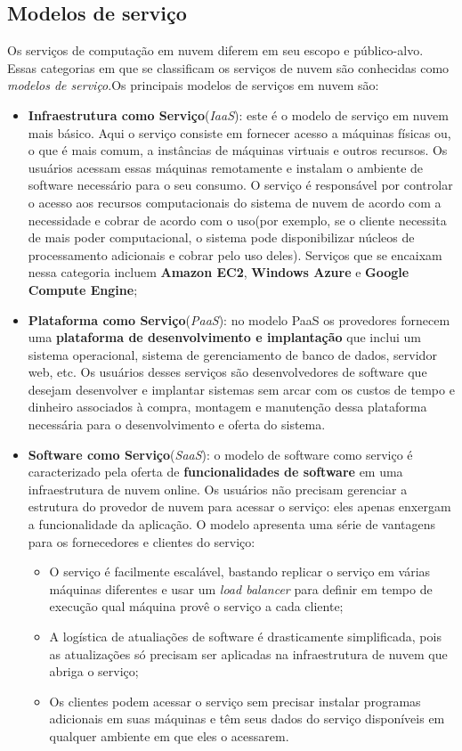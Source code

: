 \subsection{Modelos de serviço}
Os serviços de computação em nuvem diferem em seu escopo e público-alvo. Essas categorias em que se classificam os serviços de nuvem são conhecidas como \textit{modelos de serviço}.Os principais modelos de serviços em nuvem são\cite{wikiCloud}:
\begin{itemize}
	\item
	\textbf{Infraestrutura como Serviço}(\textit{IaaS}): este é o modelo de serviço em nuvem mais básico. Aqui o serviço consiste em fornecer acesso a máquinas físicas ou, o que é mais comum, a instâncias de máquinas virtuais e outros recursos. Os usuários acessam essas máquinas remotamente e instalam o ambiente de software necessário para o seu consumo. O serviço é responsável por controlar o acesso aos recursos computacionais do sistema de nuvem de acordo com a necessidade e cobrar de acordo com o uso(por exemplo, se o cliente necessita de mais poder computacional, o sistema pode disponibilizar núcleos de processamento adicionais e cobrar pelo uso deles). Serviços que se encaixam nessa categoria incluem \textbf{Amazon EC2}, \textbf{Windows Azure} e \textbf{Google Compute Engine};
	\item
	\textbf{Plataforma como Serviço}(\textit{PaaS}): no modelo PaaS os provedores fornecem uma \textbf{plataforma de desenvolvimento e implantação} que inclui um sistema operacional, sistema de gerenciamento de banco de dados, servidor web, etc. Os usuários desses serviços são desenvolvedores de software que desejam desenvolver e implantar sistemas sem arcar com os custos de tempo e dinheiro associados à compra, montagem e manutenção dessa plataforma necessária para o desenvolvimento e oferta do sistema.
	\item
	\textbf{Software como Serviço}(\textit{SaaS}): o modelo de software como serviço é caracterizado pela oferta de \textbf{funcionalidades de software} em uma infraestrutura de nuvem online. Os usuários não precisam gerenciar a estrutura do provedor de nuvem para acessar o serviço: eles apenas enxergam a funcionalidade da aplicação. O modelo apresenta uma série de vantagens para os fornecedores e clientes do serviço:
	
	\begin{itemize}
		\item
		O serviço é facilmente escalável, bastando replicar o serviço em várias máquinas diferentes e usar um \textit{load balancer} para definir em tempo de execução qual máquina provê o serviço a cada cliente;
		\item
		A logística de atualiações de software é drasticamente simplificada, pois as atualizações só precisam ser aplicadas na infraestrutura de nuvem que abriga o serviço;
		\item
		Os clientes podem acessar o serviço sem precisar instalar programas adicionais em suas máquinas e têm seus dados do serviço disponíveis em qualquer ambiente em que eles o acessarem.
	\end{itemize}
	

\end{itemize}
